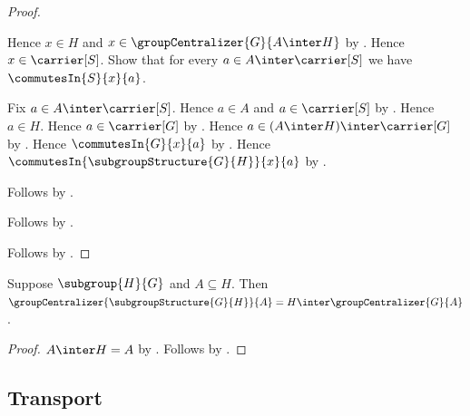 \begin{proof}
\begin{subproof}
\begin{subproof}
            Hence $x\in H$ and
                $x\in\groupCentralizer{G}{A\inter H}$ by
                .
            Hence $x\in\carrier[S]$.
            Show that for every $a\in A\inter\carrier[S]$ we have
                $\commutesIn{S}{x}{a}$.
            \begin{subproof}
                Fix $a\in A\inter\carrier[S]$.
                Hence $a\in A$ and $a\in\carrier[S]$ by
                    .
                Hence $a\in H$.
                Hence $a\in\carrier[G]$ by .
                Hence $a\in(A\inter H)\inter\carrier[G]$ by
                    .
                Hence $\commutesIn{G}{x}{a}$ by
                    .
                Hence
                    $\commutesIn{\subgroupStructure{G}{H}}{x}{a}$ by
                    .
            \end{subproof}
            Follows by .
        \end{subproof}
        Follows by \auto.
    \end{subproof}
    Follows by .
\end{proof}

\begin{corollary}\label{subgroup_structure_centralizer_of_subset}
    Suppose $\subgroup{H}{G}$ and $A\subseteq H$.
    Then
        $\groupCentralizer{\subgroupStructure{G}{H}}{A}=
            H\inter\groupCentralizer{G}{A}$.
\end{corollary}
\begin{proof}
    $A\inter H=A$ by .
    Follows by .
\end{proof}

\subsection{Transport}

